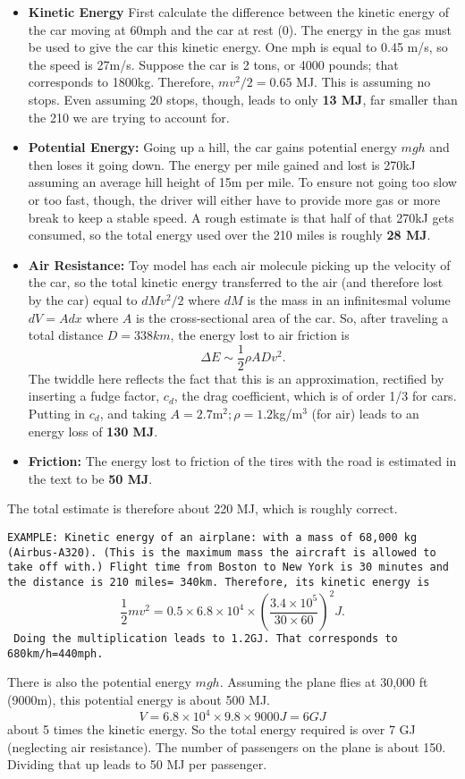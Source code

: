 \documentclass[11pt]{book}
\def\be{\begin{equation}}
\def\ee{\end{equation}}
\newcommand\example[1]{{\tt EXAMPLE: #1}}
\newcommand\bei{\begin{itemize}}
\newcommand\eei{\end{itemize}}
\begin{document}
\bei
\item {\bf Kinetic Energy} First calculate the difference between the kinetic energy of the car moving at 60mph and the car at rest (0). The energy in the gas must be used to give the car this kinetic energy. One mph is equal to 0.45 m/s, so the speed is 27m/s. Suppose the car is 2 tons, or 4000 pounds; that corresponds to 1800kg. Therefore, $mv^2/2=0.65$ MJ. This is assuming no stops. Even assuming 20 stops, though, leads to only {\bf 13 MJ}, far smaller than the 210 we are trying to account for. 
\item {\bf Potential Energy:} Going up a hill, the car gains potential energy $mgh$ and then loses it going down. The energy per mile gained and lost is 270kJ assuming an average hill height of 15m per mile. To ensure not going too slow or too fast, though, the driver will either have to provide more gas or more break to keep a stable speed. A rough estimate is that half of that 270kJ gets consumed, so the total energy used over the 210 miles is roughly {\bf 28 MJ}.
\item {\bf Air Resistance:} Toy model has each air molecule picking up the velocity of the car, so the total kinetic energy transferred to the air (and therefore lost by the car) equal to $dMv^2/2$ where $dM$ is the mass in an infinitesmal volume $dV = Adx$ where $A$ is the cross-sectional area of the car. So, after traveling a total distance $D=338km$, the energy lost to air friction is
\be
\Delta E \sim \frac12 \rho A D v^2
.\ee 
The twiddle here reflects the fact that this is an approximation, rectified by inserting a fudge factor, $c_d$, the drag coefficient, which is of order 1/3 for cars. Putting in $c_d$, and taking $A=2.7$m$^2; \rho=1.2$kg/m$^3$ (for air) leads to an energy loss of {\bf 130 MJ}.
\item {\bf Friction:} The energy lost to friction of the tires with the road is estimated in the text to be {\bf 50 MJ}.
\eei
The total estimate is therefore about 220 MJ, which is roughly correct.

\example{Kinetic energy of an airplane: with a mass of 68,000 kg (Airbus-A320). (This is the maximum mass the aircraft is allowed to take off with.) Flight time from Boston to New York is 30 minutes and the distance is 210 miles= 340km. Therefore, its kinetic energy is 
\be
\frac12 mv^2 = 0.5\times 6.8\times 10^4 \times \left(\frac{3.4\times 10^5}{30\times60} \right)^2 J.\ee
Doing the multiplication leads to 1.2GJ. That  corresponds to 680km/h=440mph.

There is also the potential energy $mgh$. Assuming the plane flies at 30,000 ft (9000m), this potential energy is about 500 MJ.
\be
V = 6.8\times 10^4\times 9.8\times 9000J = 6GJ\ee
about 5 times the kinetic energy. So the total energy required is over 7 GJ (neglecting air resistance).
The number of passengers on the plane is about 150. Dividing that up leads to 50 MJ per passenger.
}
\end{document}
